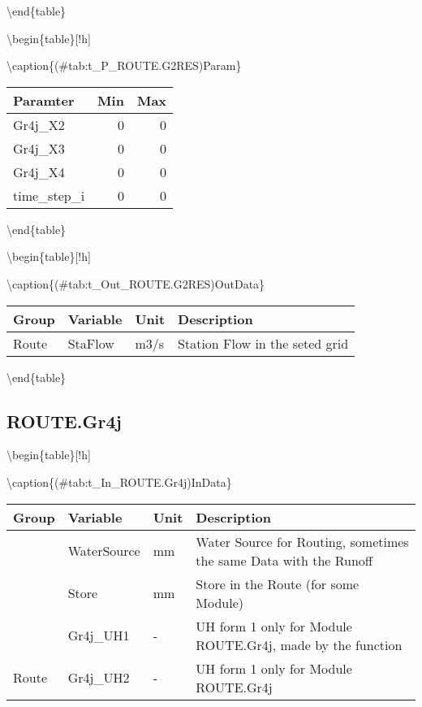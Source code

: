 \documentclass[
]{book}
\begin{document}
\textbackslash end\{table\}

\textbackslash begin\{table\}{[}!h{]}

\textbackslash caption\{(\#tab:t\_P\_ROUTE.G2RES)Param\}
\centering

\begin{tabular}[t]{l|r|r}
\hline
Paramter & Min & Max\\
\hline
Gr4j\_X2 & 0 & 0\\
\cline{1-3}
Gr4j\_X3 & 0 & 0\\
\cline{1-3}
Gr4j\_X4 & 0 & 0\\
\cline{1-3}
time\_step\_i & 0 & 0\\
\hline
\end{tabular}

\textbackslash end\{table\}

\textbackslash begin\{table\}{[}!h{]}

\textbackslash caption\{(\#tab:t\_Out\_ROUTE.G2RES)OutData\}
\centering

\begin{tabular}[t]{l|l|l|l}
\hline
Group & Variable & Unit & Description\\
\hline
Route & StaFlow & m3/s & Station Flow in the seted grid\\
\hline
\end{tabular}

\textbackslash end\{table\}

\hypertarget{route.gr4j}{%
\subsection{ROUTE.Gr4j}\label{route.gr4j}}

\textbackslash begin\{table\}{[}!h{]}

\textbackslash caption\{(\#tab:t\_In\_ROUTE.Gr4j)InData\}
\centering

\begin{tabular}[t]{l|l|l|l}
\hline
Group & Variable & Unit & Description\\
\hline
 & WaterSource & mm & Water Source for Routing, sometimes the same Data with the Runoff\\
\cline{2-4}
 & Store & mm & Store in the Route (for some Module)\\
\cline{2-4}
 & Gr4j\_UH1 & - & UH form 1 only for Module ROUTE.Gr4j, made by the function\\
\cline{2-4}
\multirow{-4}{*}{\raggedright\arraybackslash Route} & Gr4j\_UH2 & - & UH form 1 only for Module ROUTE.Gr4j\\
\hline
\end{tabular}
\end{document}
